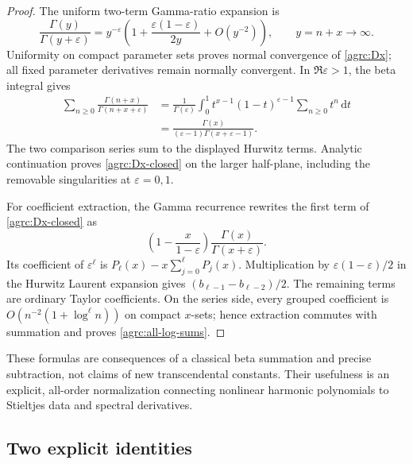 \documentclass[11pt]{article}
\numberwithin{equation}{section}
\theoremstyle{definition}\newtheorem{definition}[theorem]{Definition}
\theoremstyle{remark}\newtheorem{remark}[theorem]{Remark}
\newcommand{\dd}{\,\mathrm d}
\begin{document}
\begin{proof}
The uniform two-term Gamma-ratio expansion is
\[
 \frac{\Gamma(y)}{\Gamma(y+\varepsilon)}
 =y^{-\varepsilon}\left(1+
         \frac{\varepsilon(1-\varepsilon)}{2y}+O(y^{-2})\right),
 \qquad y=n+x\longrightarrow\infty.
\]
Uniformity on compact parameter sets proves normal convergence of
\eqref{agrc:Dx}; all fixed parameter derivatives remain normally
convergent. In $\Re\varepsilon>1$, the beta integral gives
\begin{align*}
 \sum_{n\geq0}\frac{\Gamma(n+x)}{\Gamma(n+x+\varepsilon)}
 &=\frac1{\Gamma(\varepsilon)}\int_0^1
        t^{x-1}(1-t)^{\varepsilon-1}\sum_{n\geq0}t^n\dd t\\
 &=\frac{\Gamma(x)}{(\varepsilon-1)\Gamma(x+\varepsilon-1)}.
\end{align*}
The two comparison series sum to the displayed Hurwitz terms. Analytic
continuation proves \eqref{agrc:Dx-closed} on the larger half-plane,
including the removable singularities at $\varepsilon=0,1$.

For coefficient extraction, the Gamma recurrence rewrites the first
term of \eqref{agrc:Dx-closed} as
\[
 \left(1-\frac{x}{1-\varepsilon}\right)
          \frac{\Gamma(x)}{\Gamma(x+\varepsilon)}.
\]
Its coefficient of $\varepsilon^\ell$ is
$P_\ell(x)-x\sum_{j=0}^{\ell}P_j(x)$. Multiplication by
$\varepsilon(1-\varepsilon)/2$ in the Hurwitz Laurent expansion gives
$(b_{\ell-1}-b_{\ell-2})/2$. The remaining terms are ordinary Taylor
coefficients. On the series side, every grouped coefficient is
$O(n^{-2}(1+\log^\ell n))$ on compact $x$-sets; hence extraction commutes
with summation and proves \eqref{agrc:all-log-sums}.
\end{proof}

These formulas are consequences of a classical beta summation and
precise subtraction, not claims of new transcendental constants.
Their usefulness is an explicit, all-order normalization connecting
nonlinear harmonic polynomials to Stieltjes data and spectral derivatives.

\subsection{Two explicit identities}
\end{document}
